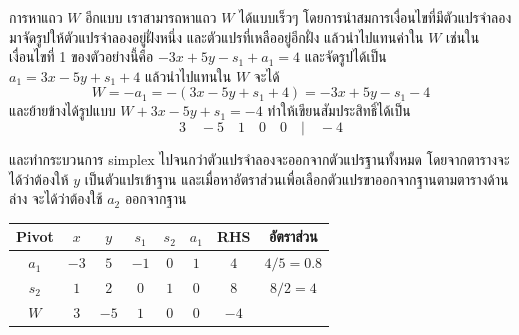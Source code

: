 \begin{solution}
\begin{enumerate}[label=\textbf{ขั้นที่ \arabic*:}, align=left, labelwidth=5em, labelsep=1em, leftmargin=*, itemsep=16pt, topsep=0pt, parsep=0pt, partopsep=0pt]
\begin{center}
    \end{center}
    \begin{remark}{การหาแถว $W$ อีกแบบ}{}
        เราสามารถหาแถว $W$ ได้แบบเร็วๆ โดยการนำสมการเงื่อนไขที่มีตัวแปรจำลองมาจัดรูปให้ตัวแปรจำลองอยู่ฝั่งหนึ่ง และตัวแปรที่เหลืออยู่อีกฝั่ง แล้วนำไปแทนค่าใน $W$ เช่นในเงื่อนไขที่ 1 ของตัวอย่างนี้คือ $-3x + 5y -s_1 + a_1 = 4$ และจัดรูปได้เป็น $a_1 = 3x - 5y + s_1 + 4$ แล้วนำไปแทนใน $W$ จะได้
        $$
        W = -a_1 = - (3x - 5y + s_1 + 4) = -3x + 5y - s_1 -4
        $$
        และย้ายข้างได้รูปแบบ $W +3x - 5y + s_1 = -4$ ทำให้เขียนสัมประสิทธิ์ได้เป็น $$3\quad-5\quad1\quad0\quad0\quad|\quad-4$$
    \end{remark}

    และทำกระบวนการ simplex ไปจนกว่าตัวแปรจำลองจะออกจากตัวแปรฐานทั้งหมด โดยจากตารางจะได้ว่าต้องให้ $y$ เป็นตัวแปรเข้าฐาน และเมื่อหาอัตราส่วนเพื่อเลือกตัวแปรขาออกจากฐานตามตารางด้านล่าง จะได้ว่าต้องใช้ $a_2$ ออกจากฐาน

    \begin{center}
        \begin{tabular}{|c|ccccc|c|c|}
            \hline
            \textbf{Pivot} & $x$ & $y$ &  $s_1$ & $s_2$ & $a_1$ &  \textbf{RHS} & อัตราส่วน  \\
            \hline
            $a_1$ & $-3$ & $5$  & $-1$ & $0$ & $1$ & $4$ & $4/5= 0.8$ \\
            $s_2$ & $1$ & $2$  & $0$ & $1$ & $0$ & $8$ & $8/2= 4$ \\
            \hline
            $W$   & $3$ & $-5$  & $1$ & $0$ & $0$ & $-4$ & \\
            \hline
        \end{tabular}
    \end{center}


\end{enumerate}
\end{solution}
